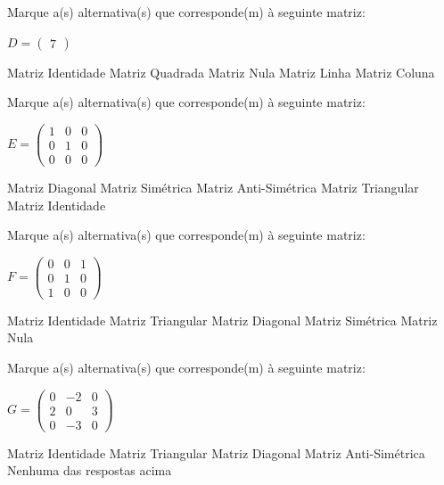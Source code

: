 \documentclass[pdftex, brazil, 12pt, oneside, addpoints]{exam}
\begin{document}
\begin{questions}
\question
Marque a(s) alternativa(s) que corresponde(m) à seguinte matriz:

\hspace{5cm}$D = \begin{pmatrix}
  7
\end{pmatrix}$
\begin{checkboxes}
  \choice Matriz Identidade
  \CorrectChoice Matriz Quadrada
  \choice Matriz Nula
  \CorrectChoice Matriz Linha
  \CorrectChoice Matriz Coluna
\end{checkboxes}

\question
Marque a(s) alternativa(s) que corresponde(m) à seguinte matriz:

\hspace{5cm}$E = \begin{pmatrix}
  1 & 0 & 0\\
  0 & 1 & 0\\
  0 & 0 & 0
\end{pmatrix}$
\begin{checkboxes}
  \CorrectChoice Matriz Diagonal
  \CorrectChoice Matriz Simétrica
  \choice Matriz Anti-Simétrica
  \choice Matriz Triangular
  \choice Matriz Identidade
\end{checkboxes}

\ifprintanswers
\newpage
\fi

\question
Marque a(s) alternativa(s) que corresponde(m) à seguinte matriz:

\hspace{5cm}$F = \begin{pmatrix}
  0 & 0 & 1\\
  0 & 1 & 0\\
  1 & 0 & 0
\end{pmatrix}$
\begin{checkboxes}
  \choice Matriz Identidade
  \choice Matriz Triangular
  \choice Matriz Diagonal
  \CorrectChoice Matriz Simétrica
  \choice Matriz Nula
\end{checkboxes}

\question
Marque a(s) alternativa(s) que corresponde(m) à seguinte matriz:

\hspace{5cm}$G = \begin{pmatrix}
  0 & -2 & 0\\
  2 & 0 & 3\\
  0 & -3 & 0
\end{pmatrix}$
\begin{checkboxes}
  \choice Matriz Identidade
  \choice Matriz Triangular
  \choice Matriz Diagonal
  \CorrectChoice Matriz Anti-Simétrica
  \choice Nenhuma das respostas acima
\end{checkboxes}


\end{questions}
\end{document}
